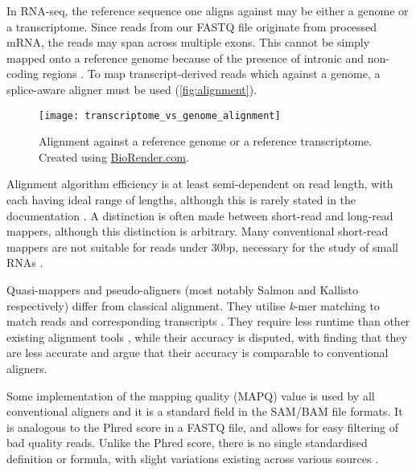 In RNA-seq, the reference sequence one aligns against may be either a genome or a transcriptome. Since reads from our FASTQ file originate from processed mRNA, the reads may span across multiple exons. This cannot be simply mapped onto a reference genome because of the presence of intronic and non-coding regions \citep{rnadataanalysis2020}. To map transcript-derived reads which against a genome, a splice-aware aligner must be used (\autoref{fig:alignment}).

\begin{figure}[!ht]
    \centering
    \texttt{[image: transcriptome\_vs\_genome\_alignment]}
    \caption[Alignment against a reference genome or a reference transcriptome]{Alignment against a reference genome or a reference transcriptome. Created using \href{https://biorender.com/}{BioRender.com}. } 
    \label{fig:alignment}
\end{figure}

Alignment algorithm efficiency is at least semi-dependent on read length, with each having ideal range of lengths, although this is rarely stated in the documentation \citep{albert2020biostar}. A distinction is often made between short-read and long-read mappers, although this distinction is arbitrary. Many conventional short-read mappers are not suitable for reads under 30bp, necessary for the study of small RNAs \citep{albert2020biostar, ziemann2016evaluation}.

Quasi-mappers and pseudo-aligners (most notably Salmon \citep{patro2017salmon} and Kallisto \citep{bray2016near} respectively) differ from classical alignment. They utilise \textit{k}-mer matching to match reads and corresponding transcripts \citep{rnadataanalysis2020}. They require less runtime than other existing alignment tools \citep{Zhang2017}, while their accuracy is disputed, with \cite{srivastava2020alignment} finding that they are less accurate and \cite{Zhang2017, Schaarschmidt2020} argue that their accuracy is comparable to conventional aligners.

Some implementation of the mapping quality (MAPQ) value is used by all conventional aligners and it is a standard field in the SAM/BAM file formats. It is analogous to the Phred score in a FASTQ file, and allows for easy filtering of bad quality reads. Unlike the Phred score, there is no single standardised definition or formula, with slight variations existing across various sources \citep{andrews2016mapq}.


